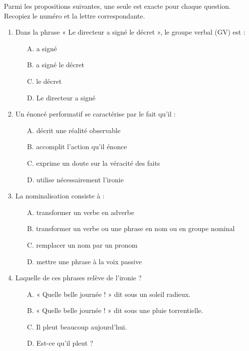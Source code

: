 \documentclass[11pt]{article}
\begin{document}
\begin{exercice}
Parmi les propositions suivantes, une seule est exacte pour chaque question. Recopiez le numéro et la lettre correspondante.
\begin{enumerate}
    \item Dans la phrase « Le directeur a signé le décret », le groupe verbal (GV) est :
    \begin{itemize}
        \item[A.] a signé
        \item[B.] a signé le décret
        \item[C.] le décret
        \item[D.] Le directeur a signé
    \end{itemize}
    \item Un énoncé performatif se caractérise par le fait qu'il :
    \begin{itemize}
        \item[A.] décrit une réalité observable
        \item[B.] accomplit l'action qu'il énonce
        \item[C.] exprime un doute sur la véracité des faits
        \item[D.] utilise nécessairement l'ironie
    \end{itemize}
    \item La nominalisation consiste à :
    \begin{itemize}
        \item[A.] transformer un verbe en adverbe
        \item[B.] transformer un verbe ou une phrase en nom ou en groupe nominal
        \item[C.] remplacer un nom par un pronom
        \item[D.] mettre une phrase à la voix passive
    \end{itemize}
    \item Laquelle de ces phrases relève de l'ironie ?
    \begin{itemize}
        \item[A.] « Quelle belle journée ! » dit sous un soleil radieux.
        \item[B.] « Quelle belle journée ! » dit sous une pluie torrentielle.
        \item[C.] Il pleut beaucoup aujourd'hui.
        \item[D.] Est-ce qu'il pleut ?
    \end{itemize}
\end{enumerate}
\end{exercice}
\end{document}
